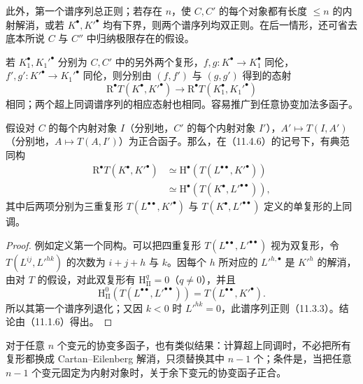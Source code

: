 此外，第一个谱序列总正则；若存在 $n$，使 $C,C'$ 的每个对象都有长度 $\leq n$ 的内射解消，或若 $K^\bullet,K'^\bullet$ 均有下界，则两个谱序列均双正则。在后一情形，还可省去底本所说 $C$ 与 $C''$ 中归纳极限存在的假设。

若 $K_1^\bullet,K_1'^\bullet$ 分别为 $C,C'$ 中的另外两个复形，$f,g:K^\bullet\to K_1^\bullet$ 同伦，$f',g':K'^\bullet\to K_1'^\bullet$ 同伦，则分别由 $(f,f')$ 与 $(g,g')$ 得到的态射
\[
\mathrm R^\bullet T(K^\bullet,K'^\bullet)\longrightarrow\mathrm R^\bullet T(K_1^\bullet,K_1'^\bullet)
\]
相同；两个超上同调谱序列的相应态射也相同。容易推广到任意协变加法多函子。

假设对 $C$ 的每个内射对象 $I$（分别地，$C'$ 的每个内射对象 $I'$），$A'\mapsto T(I,A')$（分别地，$A\mapsto T(A,I')$）为正合函子。那么，在（11.4.6）的记号下，有典范同构
\begin{equation}\tag{11.4.7.1}
\begin{aligned}
\mathrm R^\bullet T(K^\bullet,K'^\bullet)
&\simeq\mathrm H^\bullet(T(L^{\bullet\bullet},K'^\bullet))\\
&\simeq\mathrm H^\bullet(T(K^\bullet,L'^{\bullet\bullet})),
\end{aligned}
\end{equation}
其中后两项分别为三重复形 $T(L^{\bullet\bullet},K'^\bullet)$ 与 $T(K^\bullet,L'^{\bullet\bullet})$ 定义的单复形的上同调。
\begin{proof}
例如定义第一个同构。可以把四重复形 $T(L^{\bullet\bullet},L'^{\bullet\bullet})$ 视为双复形，令 $T(L^{ij},L'^{hk})$ 的次数为 $i+j+h$ 与 $k$。因每个 $h$ 所对应的 $L'^{h,\bullet}$ 是 $K'^h$ 的解消，由对 $T$ 的假设，对此双复形有 $\mathrm H_{\mathrm{II}}^q=0$（$q\ne0$），并且
\[
\mathrm H_{\mathrm{II}}^0(T(L^{\bullet\bullet},L'^{\bullet\bullet}))=T(L^{\bullet\bullet},K'^\bullet).
\]
所以其第一个谱序列退化；又因 $k<0$ 时 $L'^{hk}=0$，此谱序列正则（11.3.3）。结论由（11.1.6）得出。
\end{proof}
对于任意 $n$ 个变元的协变多函子，也有类似结果：计算超上同调时，不必把所有复形都换成 Cartan--Eilenberg 解消，只须替换其中 $n-1$ 个；条件是，当把任意 $n-1$ 个变元固定为内射对象时，关于余下变元的协变函子正合。

